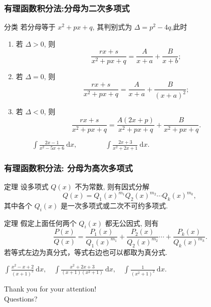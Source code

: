 \documentclass[
10pt,
aspectratio=43,
]{beamer}
\begin{document}
\begin{frame}
	\frametitle{有理函数积分法:分母为二次多项式}
	\everymath{\displaystyle}
	\pause
	\begin{block}{分类}
		若分母等于 $x^2+p x+q$, 其判别式为 $\Delta=p^2-4 q$,此时
		\begin{enumerate}
			\item<1-> 若 $\Delta>0$, 则
				$$
					\frac{r x+s}{x^2+p x+q}=\frac{A}{x+a}+\frac{B}{x+b};
				$$
			\item<2-> 若 $\Delta=0$, 则
				$$
					\frac{r x+s}{x^2+p x+q}=\frac{A}{x+a}+\frac{B}{(x+a)^2};
				$$
			\item<3-> 若 $\Delta<0$, 则
				$$
					\frac{r x+s}{x^2+p x+q}=\frac{A(2 x+p)}{x^2+p x+q}+\frac{B}{x^2+p x+q}.
				$$
		\end{enumerate}
	\end{block}
	\pause
	\begin{exampleblock}{}
		$\qquad\qquad\int \frac{2 x-1}{x^2-5 x+6}  \mathrm{~d} x,\qquad\qquad\int \frac{2 x+3}{x^2+2 x+1}\mathrm{~d}x.$
	\end{exampleblock}
\end{frame}

\begin{frame}
	\frametitle{有理函数积分法: 分母为高次多项式}
	\everymath{\displaystyle}
	\pause
	\begin{block}{定理}
		设多项式 $Q(x)$ 不为常数, 则有因式分解
		$$
			Q(x)=Q_1(x)^{m_1} Q_2(x)^{m_2} \cdots Q_k(x)^{m_k} \text {, }
		$$
		其中各个 $Q_i(x)$ 是一次多项式或二次不可约多项式.
	\end{block}
	\pause
	\begin{block}{定理}
		假定上面任何两个 $Q_i(x)$ 都无公因式, 则有
		$$
			\frac{P(x)}{Q(x)}=\frac{P_1(x)}{Q_1(x)^{m_1}}+\frac{P_2(x)}{Q_2(x)^{m_2}} \cdots+\frac{P_k(x)}{Q_k(x)^{m_k}} .
		$$
		若等式左边为真分式，等式右边也可以都取为真分式.
	\end{block}
	\pause
	\begin{exampleblock}{}
		$\int \frac{x^2-x+2}{(x+1)^3}  \mathrm{~d} x,\quad\int \frac{x^2+2 x+3}{(x+1)\left(x^2+1\right)}\mathrm{~d}x,\quad\int \frac{1}{\left(x^2+1\right)^2}\mathrm{~d}x.$
	\end{exampleblock}
\end{frame}



\begin{frame}[plain]
	\vfill
	\centering
	{
		\centering \Huge \color{white} Thank you for your attention!\\[10pt]Questions?
	}
	\vfill
\end{frame}
\end{document}
